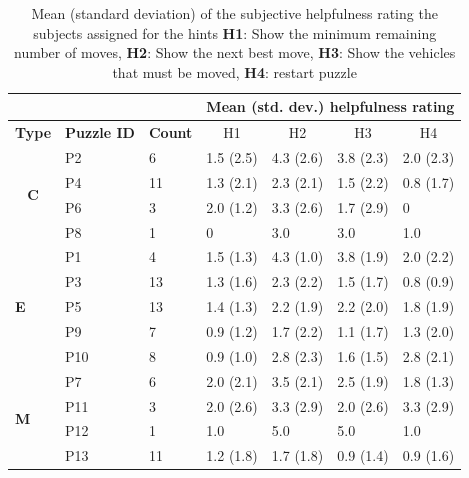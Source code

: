 \begin{table}[tbp]
\begin{tabular}{lll|l|l|l|l|}
\cline{4-7}
 &  &  & \multicolumn{4}{l|}{\textbf{Mean (std. dev.) helpfulness rating}} \\ \hline
\multicolumn{1}{|l|}{\textbf{Type}} & \multicolumn{1}{l|}{\textbf{Puzzle ID}} & \textbf{Count} & \multicolumn{1}{c|}{H1} & \multicolumn{1}{c|}{H2} & \multicolumn{1}{c|}{H3} & \multicolumn{1}{c|}{H4} \\ \hline
\multicolumn{1}{|c|}{\multirow{4}{*}{\textbf{C}}} & \multicolumn{1}{l|}{P2} & 6 & 1.5 (2.5) & 4.3 (2.6) & 3.8 (2.3) & 2.0 (2.3) \\
\multicolumn{1}{|c|}{} & \multicolumn{1}{l|}{P4} & 11 & 1.3 (2.1) & 2.3 (2.1) & 1.5 (2.2) & 0.8 (1.7) \\
\multicolumn{1}{|c|}{} & \multicolumn{1}{l|}{P6} & 3 & 2.0 (1.2) & 3.3 (2.6) & 1.7 (2.9) & 0 \\
\multicolumn{1}{|c|}{} & \multicolumn{1}{l|}{P8} & 1 & 0 & 3.0 & 3.0 & 1.0 \\ \hline
\multicolumn{1}{|l|}{\multirow{5}{*}{\textbf{E}}} & \multicolumn{1}{l|}{P1} & 4 & 1.5 (1.3) & 4.3 (1.0) & 3.8 (1.9) & 2.0 (2.2) \\
\multicolumn{1}{|l|}{} & \multicolumn{1}{l|}{P3} & 13 & 1.3 (1.6) & 2.3 (2.2) & 1.5 (1.7) & 0.8 (0.9) \\
\multicolumn{1}{|l|}{} & \multicolumn{1}{l|}{P5} & 13 & 1.4 (1.3) & 2.2 (1.9) & 2.2 (2.0) & 1.8 (1.9) \\
\multicolumn{1}{|l|}{} & \multicolumn{1}{l|}{P9} & 7 & 0.9 (1.2) & 1.7 (2.2) & 1.1 (1.7) & 1.3 (2.0) \\
\multicolumn{1}{|l|}{} & \multicolumn{1}{l|}{P10} & 8 & 0.9 (1.0) & 2.8 (2.3) & 1.6 (1.5) & 2.8 (2.1) \\ \hline
\multicolumn{1}{|l|}{\multirow{4}{*}{\textbf{M}}} & \multicolumn{1}{l|}{P7} & 6 & 2.0 (2.1) & 3.5 (2.1) & 2.5 (1.9) & 1.8 (1.3) \\
\multicolumn{1}{|l|}{} & \multicolumn{1}{l|}{P11} & 3 & 2.0 (2.6) & 3.3 (2.9) & 2.0 (2.6) & 3.3 (2.9) \\
\multicolumn{1}{|l|}{} & \multicolumn{1}{l|}{P12} & 1 & 1.0 & 5.0 & 5.0 & 1.0 \\
\multicolumn{1}{|l|}{} & \multicolumn{1}{l|}{P13} & 11 & 1.2 (1.8) & 1.7 (1.8) & 0.9 (1.4) & 0.9 (1.6) \\ \hline
\end{tabular}
\caption{Mean (standard deviation) of the subjective helpfulness rating the subjects assigned for the hints \textbf{H1}: Show the minimum remaining number of moves, \textbf{H2}: Show the next best move, \textbf{H3}: Show the vehicles that must be moved, \textbf{H4}: restart puzzle}
\label{tab:phase2ratings}
\end{table}

